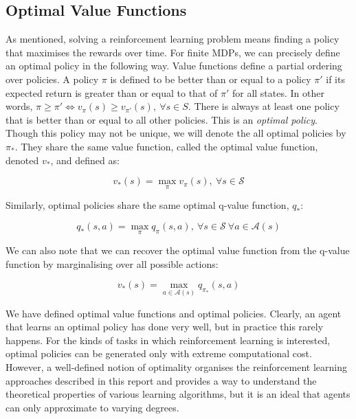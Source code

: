 \documentclass{article}
\begin{document}
\subsection{Optimal Value Functions}

As mentioned, solving a reinforcement learning problem means finding a policy that maximises the rewards over time. For finite MDPs, we can precisely define an optimal policy in the following way. Value functions define a partial ordering over policies. A policy $\pi$ is defined to be better than or equal to a policy $\pi'$ if its expected return is greater than or equal to that of $\pi'$ for all states. In other words, $ \pi \geq \pi' \iff v_\pi(s) \geq v_{\pi'}(s), \ \forall s \in S$. There is always at least one policy that is better than or equal to all other policies. \citep{sutton2018reinforcement} This is an \textit{optimal policy}. Though this policy may not be unique, we will denote the all optimal policies by $\pi_*$. They share the same value function, called the optimal value function, denoted $v_*$, and defined as:

\begin{equation}
	v_*(s) = \max_{\pi} v_\pi(s), \ \forall s \in \mathcal{S}
\end{equation}

Similarly, optimal policies share the same optimal q-value function, $q_*$:

\begin{equation}
	q_*(s, a) = \max_{\pi} q_\pi(s, a), \ \forall s \in \mathcal{S} \ \forall a \in \mathcal{A}(s)
\end{equation}

 We can also note that we can recover the optimal value function from the q-value function by marginalising over all possible actions:

\begin{equation}
	v_*(s) = \max_{a \in \mathcal{A}(s)} q_{\pi_*}(s, a)
\end{equation}


We have defined optimal value functions and optimal policies. Clearly, an agent that learns an optimal policy has done very well, but in practice this rarely happens. For the kinds of tasks in which reinforcement learning is interested, optimal policies can be generated only with extreme computational cost. However, a well-defined notion of optimality organises the reinforcement learning approaches described in this report and provides a way to understand the theoretical properties of various learning algorithms, but it is an ideal that agents can only approximate to varying degrees.
\end{document}
